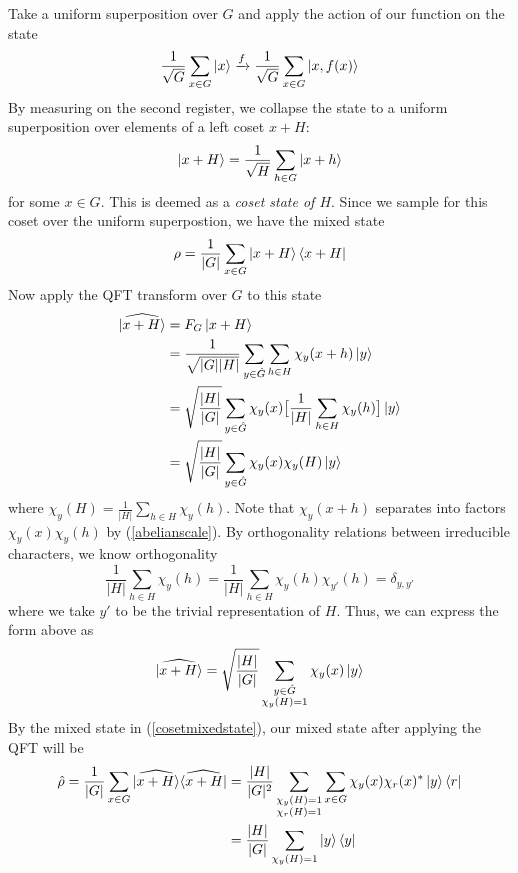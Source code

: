 \documentclass{../quantum.tex}
\begin{document}
Take a uniform superposition over $G$ and apply the action of our function on the state
%
\begin{equation}
  \frac{1}{\sqrt{G}}\sum_{x \in G} \ket{x} \xrightarrow{f} \frac{1}{\sqrt{G}}\sum_{x \in G} \ket{x, f(x)}
\end{equation}
By measuring on the second register, we collapse the state to a uniform superposition over elements of a left coset $x + H$:
%
\begin{equation}
  \ket{x + H} = \frac{1}{\sqrt{H}} \sum_{h \in G} \ket{x + h}
\end{equation}
%
for some $x \in G$. This is deemed as a \textit{coset state of $H$}. Since we sample for this coset over the uniform superpostion, we have the mixed state
%
\begin{equation}
  \label{cosetmixedstate}
  \rho = \frac{1}{|G|} \sum_{x \in G} \ket{x + H}\bra{x + H}
\end{equation}
%
Now apply the QFT transform over $G$ to this state
\begin{equation}
  \begin{split}
    \widehat{\ket{x + H}}
    & = F_G\ket{x + H} \\
    & = \frac{1}{\sqrt{|G||H|}} \sum_{y \in \hat{G}} \sum_{h \in H} \chi_y(x + h) \ket{y} \\
    & = \sqrt{\frac{|H|}{|G|}}\sum_{y \in \hat{G}}\chi_y(x)\big[ \frac{1}{|H|} \sum_{h \in H} \chi_y(h)\big]\ket{y} \\
    & = \sqrt{\frac{|H|}{|G|}}\sum_{y \in \hat{G}}\chi_y(x)\chi_y(H)\ket{y}
  \end{split}
\end{equation}
where
$\chi_y(H) = \frac{1}{|H|} \sum_{h \in H} \chi_y(h)$.
%
Note that $\chi_y(x+h)$ separates into factors $\chi_y(x)\chi_y(h)$ by (\ref{abelianscale}).
%
By orthogonality relations between irreducible characters, we know orthogonality
$$ \frac{1}{|H|}\sum_{h \in H} \chi_y(h) = \frac{1}{|H|}\sum_{h \in H} \chi_y(h) \chi_{y'}(h) = \delta_{y,y'}$$
where we take $y'$ to be the trivial representation of $H$. Thus, we can express the form above as
%
\begin{equation}
  \widehat{\ket{x + H}} = \sqrt{\frac{|H|}{|G|}} \sum_{\substack{y \in \hat{G} \\ \chi_y(H) = 1}}
  \chi_y(x) \ket{y}
\end{equation}
%
By the mixed state in (\ref{cosetmixedstate}), our mixed state after applying the QFT will be
%
\begin{equation}
  \begin{split}
      \hat{\rho} = \frac{1}{|G|}\sum_{x \in G} \widehat{\ket{x + H}} \widehat{\bra{x + H}} & = \frac{|H|}{|G|^2}  \sum_{\substack{\chi_y(H) = 1 \\ \chi_{r}(H) = 1}} \sum_{x \in G} \chi_y(x)\chi_r(x)^* \ket{y}\bra{r} \\
      & = \frac{|H|}{|G|} \sum_{\chi_y(H) = 1} \ket{y}\bra{y}
  \end{split}
\end{equation}
\end{document}

